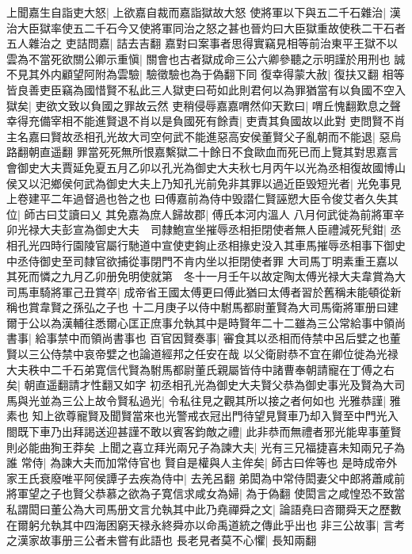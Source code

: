 上聞嘉生自詣吏大怒|{
	上欲嘉自裁而嘉詣獄故大怒}
使將軍以下與五二千石雜治|{
	漢治大臣獄率使五二千石今又使將軍同治之怒之甚也晉灼曰大臣獄重故使秩二干石者五人雜治之}
吏詰問嘉|{
	詰去吉翻}
嘉對曰案事者思得實竊見相等前治東平王獄不以雲為不當死欲關公卿示重愼|{
	關會也古者獄成命三公六卿參聽之示明謹於用刑也}
誠不見其外内顧望阿附為雲驗|{
	驗徵驗也為于偽翻下同}
復幸得蒙大赦|{
	復扶又翻}
相等皆良善吏臣竊為國惜賢不私此三人獄吏曰苟如此則君何以為罪猶當有以負國不空入獄矣|{
	吏欲文致以負國之罪故云然}
吏稍侵辱嘉嘉喟然仰天歎曰|{
	喟丘愧翻歎息之聲}
幸得充備宰相不能進賢退不肖以是負國死有餘責|{
	吏責其負國故以此對}
吏問賢不肖主名嘉曰賢故丞相孔光故大司空何武不能進惡高安侯董賢父子亂朝而不能退|{
	惡烏路翻朝直遥翻}
罪當死死無所恨嘉繫獄二十餘日不食歐血而死已而上覽其對思嘉言會御史大夫賈延免夏五月乙卯以孔光為御史大夫秋七月丙午以光為丞相復故國博山侯又以汜鄉侯何武為御史大夫上乃知孔光前免非其罪以過近臣毁短光者|{
	光免事見上卷建平二年過督過也咎之也}
曰傅嘉前為侍中毁譛仁賢誣愬大臣令俊艾者久失其位|{
	師古曰艾讀曰乂}
其免嘉為庶人歸故郡|{
	傅氏本河内溫人}
八月何武徙為前將軍辛卯光禄大夫彭宣為御史大夫　司隸鮑宣坐摧辱丞相拒閉使者無人臣禮減死髠鉗|{
	丞相孔光四時行園陵官屬行馳道中宣使吏銁止丞相掾史没入其車馬摧辱丞相事下御史中丞侍御史至司隸官欲捕從事閉門不肯内坐以拒閉使者罪}
大司馬丁明素重王嘉以其死而憐之九月乙卯册免明使就第　冬十一月壬午以故定陶太傅光禄大夫韋賞為大司馬車騎將軍己丑賞卒|{
	成帝省王國太傅更曰傅此猶曰太傅者習於舊稱未能頓從新稱也賞韋賢之孫弘之子也}
十二月庚子以侍中駙馬都尉董賢為大司馬衛將軍册曰建爾于公以為漢輔往悉爾心匡正庶事允執其中是時賢年二十二雖為三公常給事中領尚書事|{
	給事禁中而領尚書事也}
百官因賢奏事|{
	審食其以丞相而侍禁中呂后嬖之也董賢以三公侍禁中哀帝嬖之也論道經邦之任安在哉}
以父衛尉恭不宜在卿位徙為光禄大夫秩中二千石弟寛信代賢為駙馬都尉董氏親屬皆侍中諸曹奉朝請寵在丁傅之右矣|{
	朝直遥翻請才性翻又如字}
初丞相孔光為御史大夫賢父恭為御史事光及賢為大司馬與光並為三公上故令賢私過光|{
	令私往見之觀其所以接之者何如也}
光雅恭謹|{
	雅素也}
知上欲尊寵賢及聞賢當來也光警戒衣冠出門待望見賢車乃却入賢至中門光入閤既下車乃出拜謁送迎甚謹不敢以賓客鈞敵之禮|{
	此非恭而無禮者邪光能卑事董賢則必能曲狥王莽矣}
上聞之喜立拜光兩兄子為諫大夫|{
	光有三兄福捷喜未知兩兄子為誰}
常侍|{
	為諫大夫而加常侍官也}
賢自是權與人主侔矣|{
	師古曰侔等也}
是時成帝外家王氏衰廢唯平阿侯譚子去疾為侍中|{
	去羌呂翻}
弟閎為中常侍閎妻父中郎將蕭咸前將軍望之子也賢父恭慕之欲為子寛信求咸女為婦|{
	為于偽翻}
使閎言之咸惶恐不致當私謂閎曰董公為大司馬册文言允執其中此乃堯禪舜之文|{
	論語堯曰咨爾舜天之歷數在爾躬允執其中四海困窮天禄永終舜亦以命禹道統之傳此乎出也}
非三公故事|{
	言考之漢家故事册三公者未嘗有此語也}
長老見者莫不心懼|{
	長知兩翻}
